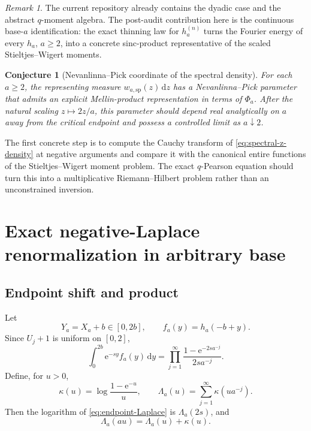 \documentclass[11pt,oneside]{article}
\newtheorem{conjecture}[theorem]{Conjecture}
\theoremstyle{definition}
\theoremstyle{remark}
\newtheorem{remark}[theorem]{Remark}
\newcommand{\e}{\mathrm e}
\newcommand{\dd}{\,\mathrm d}
\begin{document}
\begin{remark}
The current repository already contains the dyadic case and the abstract $q$-moment algebra.
The post-audit contribution here is the continuous base-$a$ identification: the exact thinning
law for $h_a^{(n)}$ turns the Fourier energy of every $h_a$, $a\ge2$, into a concrete
sinc-product representative of the scaled Stieltjes--Wigert moments.
\end{remark}

\begin{conjecture}[Nevanlinna--Pick coordinate of the spectral density]
\label{conj:spectral-nevanlinna}
For each $a\ge2$, the representing measure $w_{a,\mathrm{sp}}(z)\dd z$ has a
Nevanlinna--Pick parameter that admits an explicit Mellin-product representation in terms of
$\Phi_a$.  After the natural scaling $z\mapsto 2z/a$, this parameter should depend real
analytically on $a$ away from the critical endpoint and possess a controlled limit as
$a\downarrow2$.
\end{conjecture}

The first concrete step is to compute the Cauchy transform of \eqref{eq:spectral-z-density} at
negative arguments and compare it with the canonical entire functions of the
Stieltjes--Wigert moment problem.  The exact $q$-Pearson equation should turn this into a
multiplicative Riemann--Hilbert problem rather than an unconstrained inversion.

\section{Exact negative-Laplace renormalization in arbitrary base}
\label{sec:laplace-general}

\subsection{Endpoint shift and product}

Let
\begin{equation}
 Y_a=X_a+b\in[0,2b],
 \qquad f_a(y)=h_a(-b+y).
 \label{eq:endpoint-shift}
\end{equation}
Since $U_j+1$ is uniform on $[0,2]$,
\begin{equation}
 \int_0^{2b}\e^{-sy}f_a(y)\dd y
 =\prod_{j=1}^{\infty}
 \frac{1-\e^{-2sa^{-j}}}{2sa^{-j}}.
 \label{eq:endpoint-Laplace}
\end{equation}
Define, for $u>0$,
\begin{equation}
 \kappa(u)=\log\frac{1-\e^{-u}}{u},
 \qquad
 \Lambda_a(u)=\sum_{j=1}^{\infty}\kappa(ua^{-j}).
 \label{eq:Lambda-a}
\end{equation}
Then the logarithm of \eqref{eq:endpoint-Laplace} is $\Lambda_a(2s)$, and
\begin{equation}
 \Lambda_a(au)=\Lambda_a(u)+\kappa(u).
 \label{eq:Lambda-dilation}
\end{equation}
\end{document}
